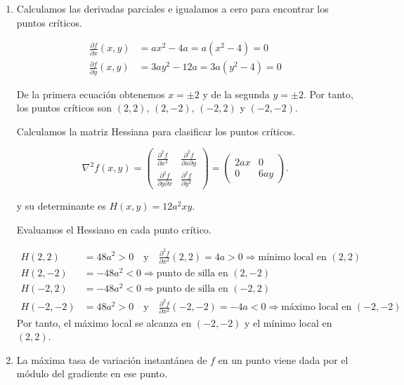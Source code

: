 \documentclass[
  spanish,
  a4paper,
]{scrreport}
\theoremstyle{definition}
\theoremstyle{remark}
\begin{document}
\begin{tcolorbox}[enhanced jigsaw, arc=.35mm, bottomrule=.15mm, bottomtitle=1mm, breakable, colback=white, colbacktitle=quarto-callout-tip-color!10!white, colframe=quarto-callout-tip-color-frame, coltitle=black, left=2mm, leftrule=.75mm, opacityback=0, opacitybacktitle=0.6, rightrule=.15mm, title=\textcolor{quarto-callout-tip-color}{\faLightbulb}\hspace{0.5em}{Solución}, titlerule=0mm, toprule=.15mm, toptitle=1mm]

\begin{enumerate}
\def\labelenumi{\alph{enumi}.}
\item
  Calculamos las derivadas parciales e igualamos a cero para encontrar
  los puntos críticos.

  \begin{align*}
  \frac{\partial f}{\partial x}(x,y) &= ax^2 - 4a = a(x^2 - 4) = 0 \\
  \frac{\partial f}{\partial y}(x,y) &= 3ay^2 - 12a = 3a(y^2 - 4) = 0
  \end{align*}

  De la primera ecuación obtenemos \(x = \pm 2\) y de la segunda
  \(y = \pm 2\). Por tanto, los puntos críticos son \((2,2)\),
  \((2,-2)\), \((-2,2)\) y \((-2,-2)\).

  Calculamos la matriz Hessiana para clasificar los puntos críticos.

  \[
  \nabla^2f(x,y) 
  = \begin{pmatrix} 
  \frac{\partial^2 f}{\partial x^2} & \frac{\partial^2 f}{\partial x \partial y} \\[6pt]
  \frac{\partial^2 f}{\partial y \partial x} & \frac{\partial^2 f}{\partial y^2}
  \end{pmatrix} 
  = \begin{pmatrix} 
  2ax & 0 \\ 
  0 & 6ay 
  \end{pmatrix}.
  \]

  y su determinante es \(H(x,y) = 12a^2xy\).

  Evaluamos el Hessiano en cada punto crítico.

  \begin{align*}
  H(2,2) &= 48a^2 > 0 \quad \text{y} \quad \frac{\partial^2 f}{\partial x^2}(2,2) = 4a > 0 \Rightarrow \text{mínimo local en } (2,2) \\
  H(2,-2) &= -48a^2 < 0 \Rightarrow \text{punto de silla en } (2,-2) \\
  H(-2,2) &= -48a^2 < 0 \Rightarrow \text{punto de silla en } (-2,2) \\
  H(-2,-2) &= 48a^2 > 0 \quad \text{y} \quad \frac{\partial^2 f}{\partial x^2}(-2,-2) = -4a < 0 \Rightarrow \text{máximo local en } (-2,-2)
  \end{align*} Por tanto, el máximo local se alcanza en \((-2,-2)\) y el
  mínimo local en \((2,2)\).
\item
  La máxima tasa de variación instantánea de \(f\) en un punto viene
  dada por el módulo del gradiente en ese punto.


\end{enumerate}
\end{tcolorbox}
\end{document}
